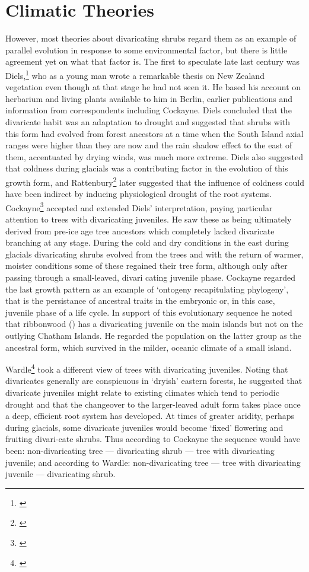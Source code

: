 \section{Climatic Theories}

However, most theories about divaricating shrubs regard them as an example of parallel evolution in response to some environmental factor, but there is little agreement yet on what that factor is.
The first to speculate late last century was Diels,\footnote{\cite{diels1897vegetations}} who as a young man wrote a remarkable thesis on New Zealand vegetation even though at that stage he had not seen it.
He based his account on herbarium and living plants available to him in Berlin, earlier publications and information from correspondents including Cockayne.
Diels concluded that the divaricate habit was an adaptation to drought and suggested that shrubs with this form had evolved from forest ancestors at a time when the South Island axial ranges were higher than they are now and the rain shadow effect to the east of them, accentuated by drying winds, was much more extreme.
Diels also suggested that coldness during glacials was a contributing factor in the evolution of this growth form, and Rattenbury\footnote{\cite{rattenbury1962cyclic}} later suggested that the influence of coldness could have been indirect by inducing physiological drought of the root systems.
Cockayne\footnote{\cite{cockayne1912observations}} accepted and extended Diels' interpretation, paying particular attention to trees with divaricating juveniles.
He saw these as being ultimately derived from pre-ice age tree ancestors which completely lacked divaricate branching at any stage.
During the cold and dry conditions in the east during glacials divaricating shrubs evolved from the trees and with the return of warmer, moister conditions some of these regained their tree form, although only after passing through a small-leaved, divari cating juvenile phase.
Cockayne regarded the last growth pattern as an example of `ontogeny recapitulating phylogeny', that is the persistance of ancestral traits in the embryonic or, in this case, juvenile phase of a life cycle.
In support of this evolutionary sequence he noted that ribbonwood () has a divaricating juvenile on the main islands but not on the outlying Chatham Islands.
He regarded the population on the latter group as the ancestral form, which survived in the milder, oceanic climate of a small island.

Wardle\footnote{\cite{wardle1963evolution}} took a different view of trees with divaricating juveniles.
Noting that divaricates generally are conspicuous in `dryish' eastern forests, he suggested that divaricate juveniles might relate to existing climates which tend to periodic drought and that the changeover to the larger-leaved adult form takes place once a deep, efficient root system has developed.
At times of greater aridity, perhaps during glacials, some divaricate juveniles would become `fixed' flowering and fruiting divari-cate shrubs.
Thus according to Cockayne the sequence would have been: non-divaricating tree --- divaricating shrub --- tree with divaricating juvenile; and according to Wardle: non-divaricating tree --- tree with divaricating juvenile --- divaricating shrub.

